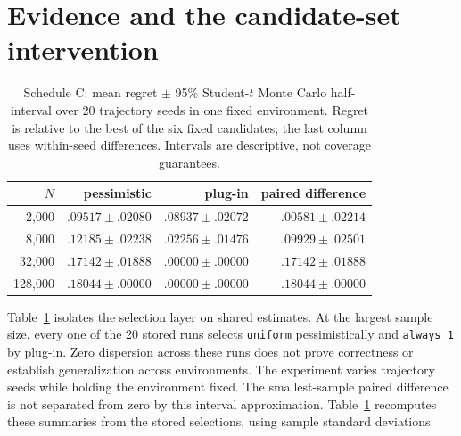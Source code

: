 \documentclass[11pt]{article}
\begin{document}
\section{Evidence and the candidate-set intervention}
\begin{table}[t]
\centering\footnotesize
\caption{Schedule C: mean regret $\pm$ 95\% Student-$t$ Monte Carlo
half-interval over 20 trajectory seeds in one fixed environment. Regret is
relative to the best of the six fixed candidates; the last column uses
within-seed differences. Intervals are descriptive, not coverage guarantees.}
\begin{tabular}{rrrr}\toprule
$N$ & pessimistic & plug-in & paired difference\\\midrule
2,000 & $.09517\pm.02080$ & $.08937\pm.02072$ & $.00581\pm.02214$\\
8,000 & $.12185\pm.02238$ & $.02256\pm.01476$ & $.09929\pm.02501$\\
32,000 & $.17142\pm.01888$ & $.00000\pm.00000$ & $.17142\pm.01888$\\
128,000 & $.18044\pm.00000$ & $.00000\pm.00000$ & $.18044\pm.00000$\\\bottomrule
\end{tabular}\label{tab:fixed}
\end{table}
Table~\ref{tab:fixed} isolates the selection layer on shared estimates.
At the largest sample size, every one of the 20 stored runs selects
\texttt{uniform} pessimistically and \texttt{always\_1} by plug-in.
Zero dispersion across these runs does not prove correctness or establish
generalization across environments. The experiment varies trajectory seeds
while holding the environment fixed.
The smallest-sample paired difference is not separated from zero by this
interval approximation. Table~\ref{tab:fixed} recomputes these summaries
from the stored selections, using sample standard deviations.
\end{document}
